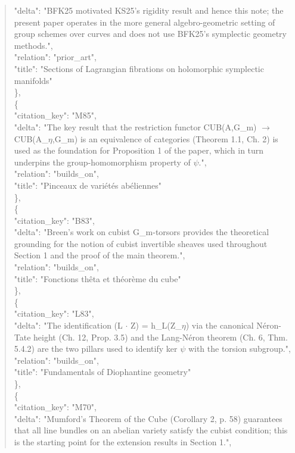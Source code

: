 \documentclass[11pt]{article}
\begin{document}
\begin{quote}
      "delta": "BFK25 motivated KS25's rigidity result and hence this note; the present paper operates in the more general algebro-geometric setting of group schemes over curves and does not use BFK25's symplectic geometry methods.",\\
      "relation": "prior\_art",\\
      "title": "Sections of Lagrangian fibrations on holomorphic symplectic manifolds"\\
    \},\\
    \{\\
      "citation\_key": "M85",\\
      "delta": "The key result that the restriction functor CUB(A,G\_m) \ensuremath{\to} CUB(A\_\ensuremath{\eta},G\_m) is an equivalence of categories (Theorem 1.1, Ch. 2) is used as the foundation for Proposition 1 of the paper, which in turn underpins the group-homomorphism property of \ensuremath{\psi}.",\\
      "relation": "builds\_on",\\
      "title": "Pinceaux de variétés abéliennes"\\
    \},\\
    \{\\
      "citation\_key": "B83",\\
      "delta": "Breen's work on cubist G\_m-torsors provides the theoretical grounding for the notion of cubist invertible sheaves used throughout Section 1 and the proof of the main theorem.",\\
      "relation": "builds\_on",\\
      "title": "Fonctions thêta et théorème du cube"\\
    \},\\
    \{\\
      "citation\_key": "L83",\\
      "delta": "The identification (L \ensuremath{\cdot} Z) = h\_L(Z\_\ensuremath{\eta}) via the canonical Néron-Tate height (Ch. 12, Prop. 3.5) and the Lang-Néron theorem (Ch. 6, Thm. 5.4.2) are the two pillars used to identify ker \ensuremath{\psi} with the torsion subgroup.",\\
      "relation": "builds\_on",\\
      "title": "Fundamentals of Diophantine geometry"\\
    \},\\
    \{\\
      "citation\_key": "M70",\\
      "delta": "Mumford's Theorem of the Cube (Corollary 2, p. 58) guarantees that all line bundles on an abelian variety satisfy the cubist condition; this is the starting point for the extension results in Section 1.",\\

\end{quote}
\end{document}
